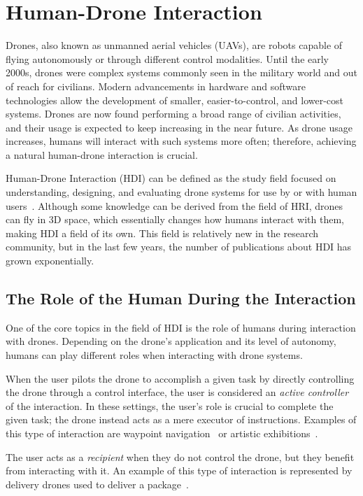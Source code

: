 \section{Human-Drone Interaction}\label{sec:soa_hdi}
Drones, also known as unmanned aerial vehicles (UAVs), are robots capable of flying autonomously or through different control modalities.
Until the early 2000s, drones were complex systems commonly seen in the military world and out of reach for civilians. 
Modern advancements in hardware and software technologies allow the development of smaller, easier-to-control, and lower-cost systems.
Drones are now found performing a broad range of civilian activities, and their usage is expected to keep increasing in the near future.
As drone usage increases, humans will interact with such systems more often; therefore, achieving a natural human-drone interaction is crucial.

Human-Drone Interaction (HDI) can be defined as the study field focused on understanding, designing, and evaluating drone systems 
for use by or with human users~\cite{tezza2019hdi}. Although some knowledge can be derived from the field of HRI, 
drones can fly in 3D space, which essentially changes how humans interact with them, making HDI a field of its own.
This field is relatively new in the research community, but in the last few years, the number of publications about HDI has grown exponentially.

\subsection{The Role of the Human During the Interaction}\label{subsec:hdi_interacction_role}
One of the core topics in the field of HDI is the role of humans during interaction with drones.
Depending on the drone's application and its level of autonomy, humans can play different roles when interacting with drone systems.

When the user pilots the drone to accomplish a given task by directly controlling the drone through a control interface, 
the user is considered an \textit{active controller} of the interaction. In these settings, the user's role is crucial to complete the given task; the drone instead acts as a mere executor of instructions. 
Examples of this type of interaction are waypoint navigation~\cite{hoppe2019droneOS} or artistic exhibitions~\cite{eriksson2020ethicsInMovement}.

The user acts as a \textit{recipient} when they do not control the drone, but they benefit from interacting with it. 
An example of this type of interaction is represented by delivery drones used to deliver a package~\cite{singireddy2018primeAir,hoppe2019droneOS, wingDrones}.

